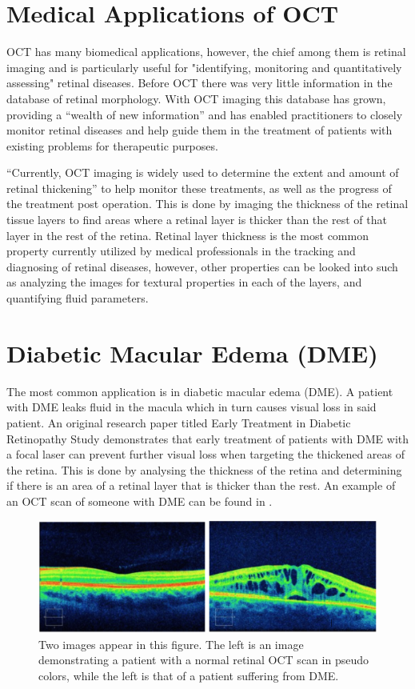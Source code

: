 \section{Medical Applications of OCT}
OCT has many biomedical applications, however, the chief among them is retinal imaging
and is particularly useful for "identifying, monitoring and quantitatively assessing" retinal
diseases.\cite{mbib_9,mbib_4, mbib_5}  Before OCT there was very little information in
the database of retinal morphology.  With OCT imaging this database has grown, providing a
“wealth of new information” and has enabled practitioners to closely monitor retinal
diseases and help guide them in the treatment of patients with existing problems for
therapeutic purposes.\cite{mbib_4} 

“Currently, OCT imaging is widely used to determine the extent and amount of retinal thickening”
to help monitor these treatments, as well as the progress of the treatment post operation.
This is done by imaging the thickness of the retinal tissue layers to find areas where a
retinal layer is thicker than the rest of that layer in the rest of the retina.  Retinal
layer thickness is the most common property currently utilized by medical professionals
in the tracking and diagnosing of retinal diseases, however, other properties can be looked
into such as analyzing the images for textural properties in each of the layers, and quantifying
fluid parameters. \cite{mbib_4}

\section{Diabetic Macular Edema (DME)}
The most common application is in diabetic macular edema (DME). A patient with DME  leaks
fluid in the macula which in turn causes visual loss in said patient.  An original research
paper titled Early Treatment in Diabetic Retinopathy Study demonstrates that early treatment
of patients with DME with a focal laser can prevent further visual loss when targeting the
thickened areas of the retina. \cite{mbib_4}  This is done by analysing the thickness of the
retina and determining if there is an area of a retinal layer that is thicker than the rest.
An example of an OCT scan of someone with DME can be found in . 

\begin{figure}[htbp]
\centering
 \includegraphics{figures/morgan_5}
\caption{Two images appear in this figure.  The left is an image demonstrating a patient with a normal retinal OCT scan in pseudo colors, while the left is that of a patient suffering from DME. \cite{mbib_10} }
\label{fig:m_5}
\end{figure}

